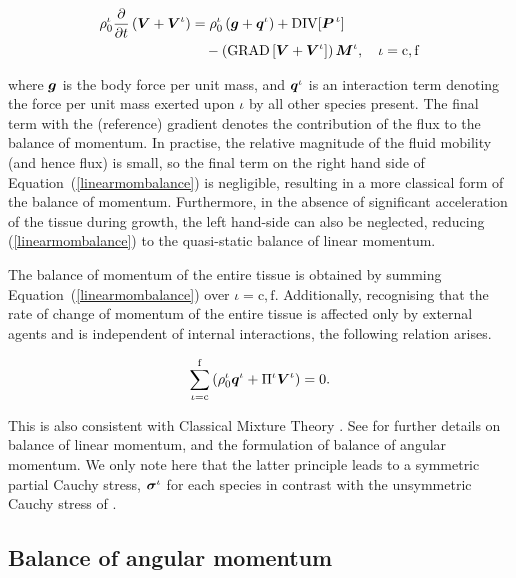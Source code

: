 \begin{equation}
\begin{split}
\rho_0^\iota\frac{\partial}{\partial t}\left(\mbox{\boldmath$ V$}+\mbox{\boldmath$ V$}^\iota\right) &
=\rho^\iota_0\left(\mbox{\boldmath$ g$}+\mbox{\boldmath$ q$}^\iota\right) +
\mathrm{\small{DIV}}[\mbox{\boldmath$ P$}^{\,\iota}]\\ 
& \quad -\left(\mathrm{\small{GRAD}}\left[\mbox{\boldmath$ V$}+
  \mbox{\boldmath$ V$}^\iota\right]\right)\mbox{\boldmath$ M$}^\iota, \quad \iota = \mathrm{c,f}
\label{linearmombalance}
\end{split}
\end{equation} 

\noindent where $\mbox{\boldmath$ g$}$ is the body force per unit mass, and $\mbox{\boldmath$ q$}^\iota$
is an interaction term denoting the force per unit mass exerted upon
$\iota$ by all other species present. The final term with the
(reference) gradient denotes the contribution of the flux to the
balance of momentum. In practise, the relative magnitude of the fluid
mobility (and hence flux) is small, so the final term on the right
hand side of Equation~(\ref{linearmombalance}) is negligible,
resulting in a more classical form of the balance of
momentum. Furthermore, in the absence of significant acceleration of
the tissue during growth, the left hand-side can also be neglected,
reducing (\ref{linearmombalance}) to the quasi-static balance of
linear momentum.

The balance of momentum of the entire tissue is obtained by summing
Equation~(\ref{linearmombalance}) over $\iota = \mathrm{c,f}$. Additionally,
recognising that the rate of change of momentum of the entire tissue
is affected only by external agents and is independent of internal
interactions, the following relation arises.

\begin{equation}
\sum\limits_{\iota =
  \mathrm{c}}^\mathrm{f}\left(\rho^\iota_0\mbox{\boldmath$ q$}^\iota+\Pi^\iota
\mbox{\boldmath$ V$}^\iota 
\right)= 0. \label{qrelation}
\end{equation}

\noindent This is also consistent with Classical Mixture Theory
\citep{TruesdellNoll:65}. See \citet{growthpaper} for further
details on balance of linear momentum, and the formulation of
balance of angular momentum. We only note here that the latter
principle leads to a symmetric partial Cauchy stress,
$\mbox{\boldmath$\sigma$}^\iota$ for each species in contrast with the unsymmetric
Cauchy stress of \cite{EpsteinMaugin:2000}.

\subsection{Balance of angular momentum}
\label{balance-of-angular-momentum}

